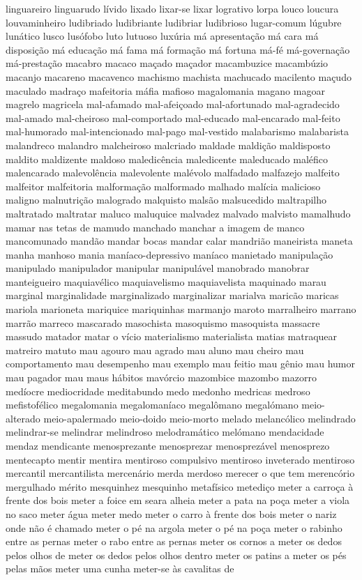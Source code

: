 \documentclass[ruledheader]{abnt_UFF}
\begin{document}
linguareiro linguarudo l\'{i}vido lixado lixar-se lixar logrativo lorpa louco loucura louvaminheiro ludibriado ludibriante ludibriar ludibrioso lugar-comum l\'{u}gubre lun\'{a}tico lusco lus\'{o}fobo luto lutuoso lux\'{u}ria m\'{a} apresenta\c{c}\~ao m\'{a} cara m\'{a} disposi\c{c}\~ao m\'{a} educa\c{c}\~ao m\'{a} fama m\'{a} forma\c{c}\~ao m\'{a} fortuna m\'{a}-f\'{e} m\'{a}-governa\c{c}\~ao m\'{a}-presta\c{c}\~ao macabro macaco ma\c{c}ado ma\c{c}ador macambuzice macamb\'{u}zio macanjo macareno macavenco machismo machista machucado macilento ma\c{c}udo maculado madra\c{c}o mafeitoria m\'{a}fia mafioso magalomania magano magoar magrelo magricela mal-afamado mal-afei\c{c}oado mal-afortunado mal-agradecido mal-amado mal-cheiroso mal-comportado mal-educado mal-encarado mal-feito mal-humorado mal-intencionado mal-pago mal-vestido malabarismo malabarista malandreco malandro malcheiroso malcriado maldade maldi\c{c}\~ao maldisposto maldito maldizente maldoso maledic\^{e}ncia maledicente maleducado mal\'{e}fico malencarado malevol\^{e}ncia malevolente mal\'{e}volo malfadado malfazejo malfeito malfeitor malfeitoria malforma\c{c}\~ao malformado malhado mal\'{i}cia malicioso maligno malnutri\c{c}\~ao malogrado malquisto mals\~ao malsucedido maltrapilho maltratado maltratar maluco maluquice malvadez malvado malvisto mamalhudo mamar nas tetas de mamudo manchado manchar a imagem de manco mancomunado mand\~ao mandar bocas mandar calar mandri\~ao maneirista maneta manha manhoso mania man\'{i}aco-depressivo man\'{i}aco manietado manipula\c{c}\~ao manipulado manipulador manipular manipul\'{a}vel manobrado manobrar manteigueiro maquiav\'{e}lico maquiavelismo maquiavelista maquinado marau marginal marginalidade marginalizado marginalizar marialva maric\~ao maricas mariola marioneta mariquice mariquinhas marmanjo maroto marralheiro marrano marr\~ao marreco mascarado masochista masoquismo masoquista massacre massudo matador matar o v\'{i}cio materialismo materialista matias matraquear matreiro matuto mau agouro mau agrado mau aluno mau cheiro mau comportamento mau desempenho mau exemplo mau feitio mau g\^{e}nio mau humor mau pagador mau maus h\'{a}bitos mav\'{o}rcio mazombice mazombo mazorro med\'{i}ocre mediocridade meditabundo medo medonho medricas medroso mefistof\'{e}lico megalomania megaloman\'{i}aco megal\^{o}mano megal\'{o}mano meio-alterado meio-apalermado meio-doido meio-morto melado melanc\'{o}lico melindrado melindrar-se melindrar melindroso melodram\'{a}tico mel\'{o}mano mendacidade mendaz mendicante menosprezante menosprezar menosprez\'{a}vel menosprezo mentecapto mentir mentira mentiroso compulsivo mentiroso inveterado mentiroso mercantil mercantilista mercen\'{a}rio merda merdoso merecer o que tem merenc\'{o}rio mergulhado m\'{e}rito mesquinhez mesquinho metaf\'{i}sico metedi\c{c}o meter a carro\c{c}a \`{a} frente dos bois meter a foice em seara alheia meter a pata na po\c{c}a meter a viola no saco meter \'{a}gua meter medo meter o carro \`{a} frente dos bois meter o nariz onde n\~ao \'{e} chamado meter o p\'{e} na argola meter o p\'{e} na po\c{c}a meter o rabinho entre as pernas meter o rabo entre as pernas meter os cornos a meter os dedos pelos olhos de meter os dedos pelos olhos dentro meter os patins a meter os p\'{e}s pelas m\~aos meter uma cunha meter-se \`{a}s cavalitas de 
\end{document}
